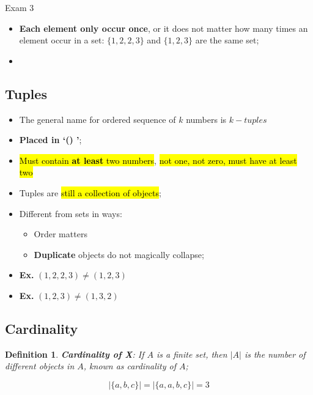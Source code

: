 \documentclass{note}
\newtheorem{definition}{Definition}
\newcommand{\ex}{\textbf{Ex.} }
\begin{document}
\begin{note}{Exam 3}
\begin{itemize}
            \item \textbf{Each element only occur once}, or it does not matter how many times an element occur in a set:
            $ \{ 1,2,2,3 \} $ and $ \{ 1,2,3 \} $ are the same set;

            \item
        \end{itemize}

        \subsection{Tuples}

        \begin{itemize}
            \item The general name for ordered sequence of $ k $ numbers is $ k-tuples $
            \item \textbf{Placed in \lq () \rq};
            \item \hl{Must contain \textbf{at least} two numbers}, \hl{not one, not zero, must have at least two}
            \item Tuples are \hl{still a collection of objects};
            \item Different from sets in ways:
            \begin{itemize}
                \item Order matters
                \item \textbf{Duplicate} objects do not magically collapse;
            \end{itemize}

            \item \ex $ (1,2,2,3) \neq (1,2,3) $
            \item \ex $ (1,2,3) \neq (1,3,2) $
        \end{itemize}

        \subsection{Cardinality}

        \begin{definition}
            \textbf{Cardinality of X}: If $ A $ is a finite set, then $ \left| A \right| $ is the number of different objects in $ A $,
            known as cardinality of $ A $;
        \end{definition}

        \begin{displaymath}
            \left| \{ a,b,c \} \right| = \left| \{ a,a,b,c \} \right| = 3
        \end{displaymath}


\end{note}
\end{document}
